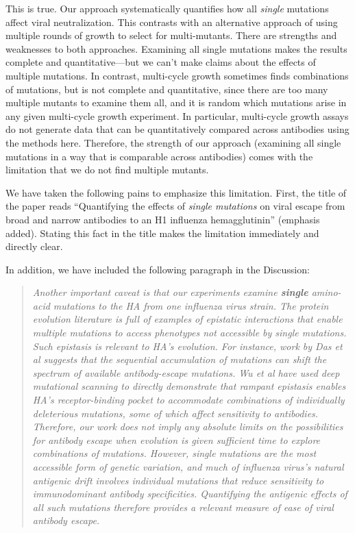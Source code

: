\documentclass[11pt, oneside]{article}   	%
\begin{document}
{\color{black}
This is true.
Our approach systematically quantifies how all \emph{single} mutations affect viral neutralization.
This contrasts with an alternative approach of using multiple rounds of growth to select for multi-mutants.
There are strengths and weaknesses to both approaches.
Examining all single mutations makes the results complete and quantitative---but we can't make claims about the effects of multiple mutations.
In contrast, multi-cycle growth sometimes finds combinations of mutations, but is not complete and quantitative, since there are too many multiple mutants to examine them all, and it is random which mutations arise in any given multi-cycle growth experiment.
In particular, multi-cycle growth assays do not generate data that can be quantitatively compared across antibodies using the methods here.
Therefore, the strength of our approach (examining all single mutations in a way that is comparable across antibodies) comes with the limitation that we do not find multiple mutants.

We have taken the following pains to emphasize this limitation. 
First, the title of the paper reads ``Quantifying the effects of \emph{single mutations} on viral escape from broad and narrow antibodies to an H1 influenza hemagglutinin'' (emphasis added). 
Stating this fact in the title makes the limitation immediately and directly clear.

In addition, we have included the following paragraph in the Discussion:

\begin{quote}
\textsl{Another important caveat is that our experiments examine {\bf single} amino-acid mutations to the HA from one influenza virus strain.
The protein evolution literature is full of examples of epistatic interactions that enable multiple mutations to access phenotypes not accessible by single mutations.
Such epistasis is relevant to HA's evolution.  
For instance, work by Das et al suggests that the sequential accumulation of mutations can shift the spectrum of available antibody-escape mutations.
Wu et al have used deep mutational scanning to directly demonstrate that rampant epistasis enables HA's receptor-binding pocket to accommodate combinations of individually deleterious mutations, some of which affect sensitivity to antibodies.
Therefore, our work does not imply any absolute limits on the possibilities for antibody escape when evolution is given sufficient time to explore combinations of mutations.
However, single mutations are the most accessible form of genetic variation, and much of influenza virus's natural antigenic drift involves individual mutations that reduce sensitivity to immunodominant antibody specificities.
Quantifying the antigenic effects of all such mutations therefore provides a relevant measure of ease of viral antibody escape. }
\end{quote}
}
\end{document}
